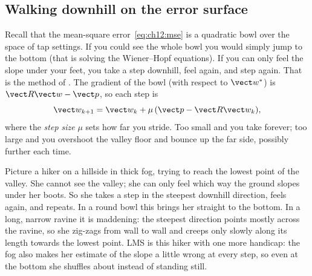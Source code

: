 
\subsection{Walking downhill on the error surface}

Recall that the mean-square error~\eqref{eq:ch12:mse} is a quadratic bowl over the space of tap
settings. If you could see the whole bowl you would simply jump to the bottom
(that is solving the Wiener--Hopf equations). If you can only feel the slope under your feet, you
take a step downhill, feel again, and step again. That is the method of .
The gradient of the bowl (with respect to $\vect w^*$) is $\vect R\vect w-\vect p$, so each step is
\begin{equation}
\vect w_{k+1}=\vect w_k+\mu\,(\vect p-\vect R\vect w_k),
\label{eq:ch12:sd}
\end{equation}
where the \emph{step size} $\mu$ sets how far you stride. Too small and you take forever; too large
and you overshoot the valley floor and bounce up the far side, possibly further each time.

\begin{analogy}
Picture a hiker on a hillside in thick fog, trying to reach the lowest point of the valley. She
cannot see the valley; she can only feel which way the ground slopes under her boots. So she takes a
step in the steepest downhill direction, feels again, and repeats. In a round bowl this brings her
straight to the bottom. In a long, narrow ravine it is maddening: the steepest direction points
mostly across the ravine, so she zig-zags from wall to wall and creeps only slowly along its length
towards the lowest point. LMS is this hiker with one more handicap: the fog also makes her estimate
of the slope a little wrong at every step, so even at the bottom she shuffles about instead of
standing still.
\end{analogy}

